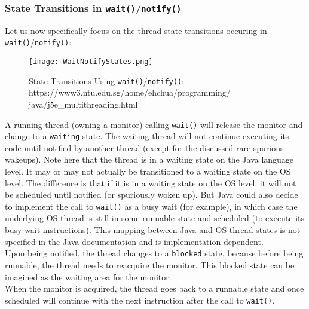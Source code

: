 \documentclass[main.tex]{subfiles}
\begin{document}
\subsubsection{State Transitions in \texttt{wait()}/\texttt{notify()}}

Let us now specifically focus on the thread state transitions occuring in \texttt{wait()}/\texttt{notify()}:
\begin{figure}[H]
    \centering
    \texttt{[image: WaitNotifyStates.png]}
    \caption{State Transitions Using \texttt{wait()}/\texttt{notify()}: https://www3.ntu.edu.sg/home/ehchua/programming/\\java/j5e\_multithreading.html}
\end{figure}
A running thread (owning a monitor) calling \texttt{wait()} will release the monitor and change to a \texttt{waiting} state. The waiting thread will not continue executing its code until notified by another thread (except for the discussed rare spurious wakeups). Note here that the thread is in a waiting state on the Java language level. It may or may not actually be transitioned to a waiting state on the OS level. The difference is that if it is in a waiting state on the OS level, it will not be scheduled until notified (or spuriously woken up). But Java could also decide to implement the call to \texttt{wait()} as a busy wait (for example), in which case the underlying OS thread is still in some runnable state and scheduled (to execute its busy wait instructions). This mapping between Java and OS thread states is not specified in the Java documentation and is implementation dependent.\\
Upon being notified, the thread changes to a \texttt{blocked} state, because before being runnable, the thread needs to reacquire the monitor. This blocked state can be imagined as the waiting area for the monitor.\\
When the monitor is acquired, the thread goes back to a runnable state and once scheduled will continue with the next instruction after the call to \texttt{wait()}.
\end{document}
